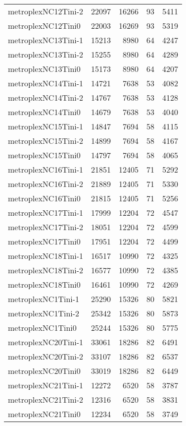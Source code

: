 \begin{longtable}{lrrrr}
metroplexNC12Tini-2 & 22097 & 16266 & 93 & 5411 \\
metroplexNC12Tini0 & 22003 & 16269 & 93 & 5319 \\
metroplexNC13Tini-1 & 15213 & 8980 & 64 & 4247 \\
metroplexNC13Tini-2 & 15255 & 8980 & 64 & 4289 \\
metroplexNC13Tini0 & 15173 & 8980 & 64 & 4207 \\
metroplexNC14Tini-1 & 14721 & 7638 & 53 & 4082 \\
metroplexNC14Tini-2 & 14767 & 7638 & 53 & 4128 \\
metroplexNC14Tini0 & 14679 & 7638 & 53 & 4040 \\
metroplexNC15Tini-1 & 14847 & 7694 & 58 & 4115 \\
metroplexNC15Tini-2 & 14899 & 7694 & 58 & 4167 \\
metroplexNC15Tini0 & 14797 & 7694 & 58 & 4065 \\
metroplexNC16Tini-1 & 21851 & 12405 & 71 & 5292 \\
metroplexNC16Tini-2 & 21889 & 12405 & 71 & 5330 \\
metroplexNC16Tini0 & 21815 & 12405 & 71 & 5256 \\
metroplexNC17Tini-1 & 17999 & 12204 & 72 & 4547 \\
metroplexNC17Tini-2 & 18051 & 12204 & 72 & 4599 \\
metroplexNC17Tini0 & 17951 & 12204 & 72 & 4499 \\
metroplexNC18Tini-1 & 16517 & 10990 & 72 & 4325 \\
metroplexNC18Tini-2 & 16577 & 10990 & 72 & 4385 \\
metroplexNC18Tini0 & 16461 & 10990 & 72 & 4269 \\
metroplexNC1Tini-1 & 25290 & 15326 & 80 & 5821 \\
metroplexNC1Tini-2 & 25342 & 15326 & 80 & 5873 \\
metroplexNC1Tini0 & 25244 & 15326 & 80 & 5775 \\
metroplexNC20Tini-1 & 33061 & 18286 & 82 & 6491 \\
metroplexNC20Tini-2 & 33107 & 18286 & 82 & 6537 \\
metroplexNC20Tini0 & 33019 & 18286 & 82 & 6449 \\
metroplexNC21Tini-1 & 12272 & 6520 & 58 & 3787 \\
metroplexNC21Tini-2 & 12316 & 6520 & 58 & 3831 \\
metroplexNC21Tini0 & 12234 & 6520 & 58 & 3749 \\

\end{longtable}
